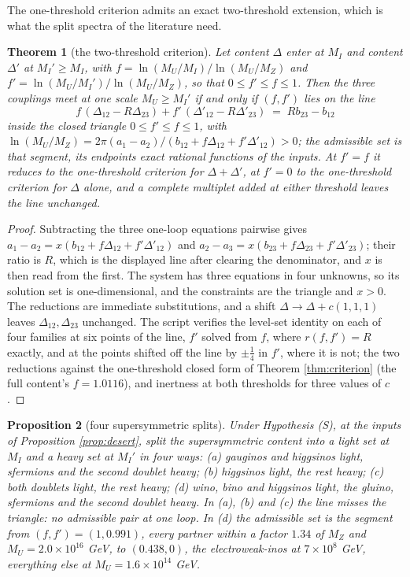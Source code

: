 \documentclass[11pt]{article}
\newtheorem{theorem}{Theorem}[section]
\newtheorem{proposition}[theorem]{Proposition}
\theoremstyle{definition}
\newcommand{\Dl}{\Delta}
\begin{document}
The one-threshold criterion admits an exact two-threshold extension, which is what the split spectra of the literature need.

\begin{theorem}[the two-threshold criterion]\label{thm:two}
Let content $\Dl$ enter at $M_{I}$ and content $\Dl'$ at $M_{I}' \ge M_{I}$, with $f = \ln(M_{U}/M_{I})/\ln(M_{U}/M_{Z})$ and $f' = \ln(M_{U}/M_{I}')/\ln(M_{U}/M_{Z})$, so that $0 \le f' \le f \le 1$. Then the three couplings meet at one scale $M_{U} \ge M_{I}'$ if and only if $(f, f')$ lies on the line
\[
f\,(\Dl_{12} - R\Dl_{23}) + f'\,(\Dl'_{12} - R\Dl'_{23}) \;=\; Rb_{23} - b_{12}
\]
inside the closed triangle $0 \le f' \le f \le 1$, with $\ln(M_{U}/M_{Z}) = 2\pi(a_{1} - a_{2})/(b_{12} + f\Dl_{12} + f'\Dl'_{12}) > 0$; the admissible set is that segment, its endpoints exact rational functions of the inputs. At $f' = f$ it reduces to the one-threshold criterion for $\Dl + \Dl'$, at $f' = 0$ to the one-threshold criterion for $\Dl$ alone, and a complete multiplet added at either threshold leaves the line unchanged.
\end{theorem}

\begin{proof}
Subtracting the three one-loop equations pairwise gives $a_{1} - a_{2} = x(b_{12} + f\Dl_{12} + f'\Dl'_{12})$ and $a_{2} - a_{3} = x(b_{23} + f\Dl_{23} + f'\Dl'_{23})$; their ratio is $R$, which is the displayed line after clearing the denominator, and $x$ is then read from the first. The system has three equations in four unknowns, so its solution set is one-dimensional, and the constraints are the triangle and $x > 0$. The reductions are immediate substitutions, and a shift $\Dl \to \Dl + c(1,1,1)$ leaves $\Dl_{12}, \Dl_{23}$ unchanged. The script verifies the level-set identity on each of four families at six points of the line, $f'$ solved from $f$, where $r(f, f') = R$ exactly, and at the points shifted off the line by $\pm\tfrac14$ in $f'$, where it is not; the two reductions against the one-threshold closed form of Theorem \ref{thm:criterion} (the full content's $f = 1.0116$), and inertness at both thresholds for three values of $c$.
\end{proof}

\begin{proposition}[four supersymmetric splits]\label{prop:splits}
Under Hypothesis (S), at the inputs of Proposition \ref{prop:desert}, split the supersymmetric content into a light set at $M_{I}$ and a heavy set at $M_{I}'$ in four ways: (a) gauginos and higgsinos light, sfermions and the second doublet heavy; (b) higgsinos light, the rest heavy; (c) both doublets light, the rest heavy; (d) wino, bino and higgsinos light, the gluino, sfermions and the second doublet heavy. In (a), (b) and (c) the line misses the triangle: no admissible pair at one loop. In (d) the admissible set is the segment from $(f, f') = (1, 0.991)$, every partner within a factor $1.34$ of $M_{Z}$ and $M_{U} = 2.0 \times 10^{16}$ GeV, to $(0.438, 0)$, the electroweak-inos at $7 \times 10^{8}$ GeV, everything else at $M_{U} = 1.6 \times 10^{14}$ GeV.
\end{proposition}
\end{document}
